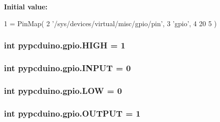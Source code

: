 {\bfseries Initial value\-:}
\begin{DoxyCode}
1 = PinMap(
2     \textcolor{stringliteral}{'/sys/devices/virtual/misc/gpio/pin'},
3     \textcolor{stringliteral}{'gpio'},
4     20
5 )
\end{DoxyCode}
\hypertarget{namespacepypcduino_1_1gpio_a017380b78afe9853e0cc3ca009c47ec3}{
\subsubsection[{H\-I\-G\-H}]{\setlength{\rightskip}{0pt plus 5cm}int pypcduino.\-gpio.\-H\-I\-G\-H = 1}}\label{namespacepypcduino_1_1gpio_a017380b78afe9853e0cc3ca009c47ec3}
\hypertarget{namespacepypcduino_1_1gpio_afabe8a2ce86d5db92f8e5994e5c24252}{
\subsubsection[{I\-N\-P\-U\-T}]{\setlength{\rightskip}{0pt plus 5cm}int pypcduino.\-gpio.\-I\-N\-P\-U\-T = 0}}\label{namespacepypcduino_1_1gpio_afabe8a2ce86d5db92f8e5994e5c24252}
\hypertarget{namespacepypcduino_1_1gpio_a7794534b6aba1a94e2ed468ec8fbed98}{
\subsubsection[{L\-O\-W}]{\setlength{\rightskip}{0pt plus 5cm}int pypcduino.\-gpio.\-L\-O\-W = 0}}\label{namespacepypcduino_1_1gpio_a7794534b6aba1a94e2ed468ec8fbed98}
\hypertarget{namespacepypcduino_1_1gpio_a810c8642dc31f28d747c4c845e8a4a80}{
\subsubsection[{O\-U\-T\-P\-U\-T}]{\setlength{\rightskip}{0pt plus 5cm}int pypcduino.\-gpio.\-O\-U\-T\-P\-U\-T = 1}}\label{namespacepypcduino_1_1gpio_a810c8642dc31f28d747c4c845e8a4a80}
